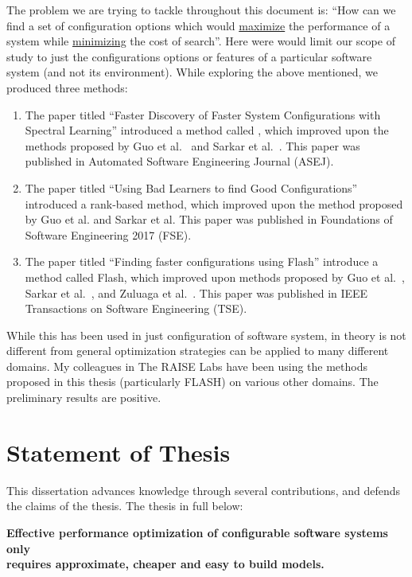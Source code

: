 The problem we are trying to tackle throughout this document is: ``How can we find a set of configuration options which would \underline{maximize} the performance of a system while \underline{minimizing} the cost of search''. Here were would limit our scope of study to just the configurations options or features of a particular software system (and not its environment). While exploring the above mentioned, we produced three methods:
\begin{enumerate}
    \item The paper titled ``Faster Discovery of Faster System Configurations with Spectral Learning'' introduced a method called \what, which improved upon the methods proposed by Guo et al.~\cite{guo2013variability} and Sarkar et al.~\cite{sarkar2015cost}. This paper was published in Automated Software Engineering Journal (ASEJ). 
    
    \item The paper titled ``Using Bad Learners to find Good Configurations'' introduced a rank-based method, which improved upon the method proposed by Guo et al. and Sarkar et al. This paper was published in Foundations of Software Engineering 2017 (FSE).
    
    \item The paper titled ``Finding faster configurations using Flash'' introduce a method called Flash, which improved upon methods proposed by Guo et al.~\cite{guo2013variability}, Sarkar et al.~\cite{sarkar2015cost}, and Zuluaga et al.~\cite{zuluaga2016varepsilon}. This paper was published in IEEE Transactions on Software Engineering (TSE).
\end{enumerate}

While this has been used in just configuration of software system, in theory is not different from general optimization strategies can be applied to many different domains. My colleagues in The RAISE Labs have been using the methods proposed in this thesis (particularly FLASH) on various other domains. The preliminary results are positive.

\section{Statement of Thesis}
This dissertation advances knowledge through several contributions, and defends
the claims of the thesis. The thesis in full
below:
\begin{center}
\begin{flushleft}
    \hspace{2cm}\textbf{Effective performance optimization  of  configurable software systems only }\\
    \hspace{2cm}\textbf{requires approximate, cheaper and easy to build models.}\\
\end{flushleft}
\end{center}

